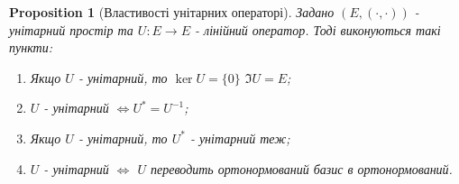 \documentclass[a4paper, 10pt]{article}
\theoremstyle{theoremdd}
\newtheorem{proposition}[theorem]{Proposition}
\begin{document}
\begin{proposition}[Властивості унітарних операторі]
Задано $(E,(\cdot,\cdot))$ - унітарний простір та $U \colon E \to E$ - лінійний оператор. Тоді виконуються такі пункти:
\begin{enumerate}[nosep,wide=0pt,label={\arabic*)}]
\item Якщо $U$ - унітарний, то $\ker U = \{0\}$ \qquad $\Im U = E$;
\item $U$ - унітарний $\iff U^* = U^{-1}$;
\item Якщо $U$ - унітарний, то $U^*$ - унітарний теж;
\item $U$ - унітарний $\iff$ $U$ переводить ортонормований базис в ортонормований.
\end{enumerate}
\end{proposition}
\end{document}
